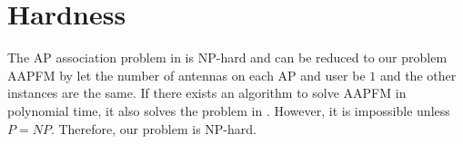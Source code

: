 \section{Hardness}
	The AP association problem in \cite{li2008proportional} is NP-hard and can be reduced to our problem AAPFM by let the number of antennas on each AP and user be $1$ and the other instances are the same. If there exists an algorithm to solve AAPFM in polynomial time, it also solves the problem in \cite{li2008proportional}. However, it is impossible unless $P = NP$. Therefore, our problem is NP-hard.